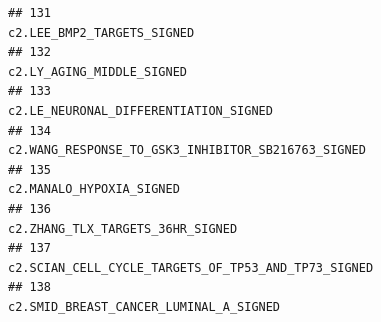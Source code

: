 \documentclass{article}\usepackage[]{graphicx}\usepackage[]{color}
\makeatletter
\newenvironment{kframe}{%
 \def\at@end@of@kframe{}%
 \ifinner\ifhmode%
  \def\at@end@of@kframe{\end{minipage}}%
  \begin{minipage}{\columnwidth}%
 \fi\fi%
 \def\FrameCommand##1{\hskip\@totalleftmargin \hskip-\fboxsep
 \colorbox{shadecolor}{##1}\hskip-\fboxsep
     \hskip-\linewidth \hskip-\@totalleftmargin \hskip\columnwidth}%
 \MakeFramed {\advance\hsize-\width
   \@totalleftmargin\z@ \linewidth\hsize
   \@setminipage}}%
 {\par\unskip\endMakeFramed%
 \at@end@of@kframe}
\newenvironment{knitrout}{}{} %
\makeatother
\begin{document}
\begin{knitrout}
\begin{kframe}
\begin{verbatim}
## 131                                                                                                                                                                                                                                                                                                                            c2.LEE_BMP2_TARGETS_SIGNED
## 132                                                                                                                                                                                                                                                                                                                             c2.LY_AGING_MIDDLE_SIGNED
## 133                                                                                                                                                                                                                                                                                                                 c2.LE_NEURONAL_DIFFERENTIATION_SIGNED
## 134                                                                                                                                                                                                                                                                                                    c2.WANG_RESPONSE_TO_GSK3_INHIBITOR_SB216763_SIGNED
## 135                                                                                                                                                                                                                                                                                                                              c2.MANALO_HYPOXIA_SIGNED
## 136                                                                                                                                                                                                                                                                                                                      c2.ZHANG_TLX_TARGETS_36HR_SIGNED
## 137                                                                                                                                                                                                                                                                                                   c2.SCIAN_CELL_CYCLE_TARGETS_OF_TP53_AND_TP73_SIGNED
## 138                                                                                                                                                                                                                                                                                                                c2.SMID_BREAST_CANCER_LUMINAL_A_SIGNED

\end{verbatim}
\end{kframe}
\end{knitrout}
\end{document}
